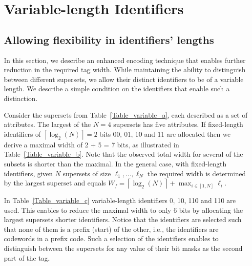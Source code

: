 \section{Variable-length Identifiers}\label{sec:identifiers}
\subsection{Allowing flexibility in identifiers' lengths}
In this section, we describe an enhanced encoding technique that enables further reduction in the required tag width.  While maintaining the ability to distinguish between different supersets, we allow their distinct identifiers to be of a variable length. We describe a simple condition on the identifiers that enable such a distinction. 

Consider the supersets from Table~\ref{Table_variable_a}, each described as a set of attributes. The largest of the $N=4$ supersets has five attributes. 
If fixed-length identifiers of $\left \lceil \log_2(N) \right \rceil = 2$ bits 00, 01, 10 and 11 are allocated then we derive a maximal width of 2 + 5 = 7 bits, as illustrated in Table~\ref{Table_variable_b}. 
Note that the observed total width for several of the subsets is shorter than the maximal.
In the general case, with fixed-length identifiers, given $N$ supersets of size $\ell_1, \ldots, \ell_N$ the required width is determined by the largest superset and equals 
 $W_{f} = \left \lceil \log_2(N) \right \rceil + \max_{i \in [1,N]} \ell_i$. 

In Table~\ref{Table_variable_c} variable-length identifiers 0, 10, 110 and 110 are used. This enables to reduce the maximal width to only 6 bits by allocating the largest supersets shorter identifiers. 
Notice that the identifiers are selected such that none of them is a prefix (start) of the other, i.e., the identifiers are codewords in a prefix code.
Such a selection of the identifiers enables to distinguish between the supersets for any value of their bit masks as the second part of the tag. 



%
%








